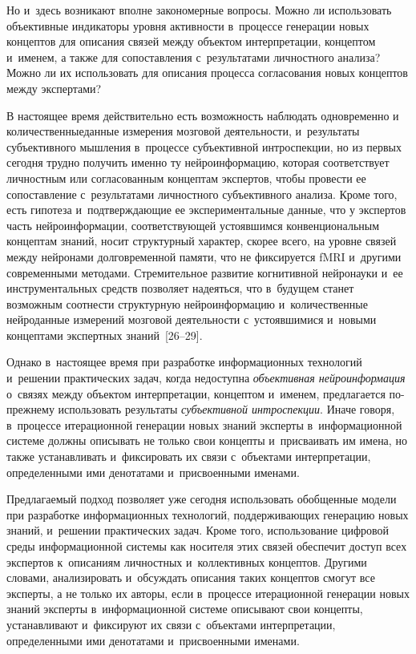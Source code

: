 {\begin{multicols}{2}
      Но и~здесь возникают вполне закономерные вопросы. Можно ли использовать 
объективные индикаторы уровня активности в~процессе генерации новых концептов для 
описания связей между объектом интерпретации, концептом и~именем, а также для 
сопоставления с~результатами личностного анализа? Можно ли их использовать для 
описания процесса согласования новых концептов между экспертами?
      
      В настоящее время действительно есть возможность наблюдать одновременно и~
количественные\linebreak данные измерения мозговой деятельности, и~результаты субъективного 
мышления в~процессе субъективной интроспекции, но из первых сегодня трудно получить 
именно ту нейроинформацию, которая соответствует личностным или согласованным 
концептам экспертов, чтобы провести ее сопоставление с~результатами личностного 
субъективного анализа. Кроме того, есть гипотеза и~подтверждающие ее 
экспериментальные данные, что у экспертов часть нейроинформации, соответствующей 
устоявшимся конвенциональным концептам знаний, носит структурный характер, скорее 
всего, на уровне связей между нейронами долговременной памяти, что не фиксируется 
fMRI и~другими современными методами. Стремительное развитие когнитивной 
нейронауки и~ее инструментальных средств позволяет надеяться, что в~будущем станет 
возможным соотнести структурную нейроинформацию и~количественные нейроданные 
измерений мозговой деятельности с~устоявшимися и~новыми концептами экспертных 
знаний~[26--29].

      
      Однако в~настоящее время при разработке информационных технологий и~решении 
практических задач, когда недоступна \textit{объективная нейроинформация} о~связях 
между объектом интерпретации, концептом и~именем, предлагается по-преж\-не\-му 
использовать результаты \textit{субъективной интроспекции}. Иначе говоря, в~процессе 
итерационной генерации новых знаний эксперты в~информационной системе должны 
описывать не только свои кон\-цеп\-ты и~присваивать им имена, но также устанавливать 
и~фиксировать их связи с~объектами интерпретации, определенными ими денотатами 
и~присвоенными именами.
      
      Предлагаемый подход позволяет уже сегодня использовать обобщенные модели при 
разработке информационных технологий, поддерживающих генерацию новых знаний, 
и~решении практических задач. Кроме того, использование цифровой среды информационной 
системы как носителя этих связей обеспечит доступ всех экспертов к~описаниям 
личностных и~коллективных концептов. Другими словами, анализировать и~обсуждать 
описания таких концептов смогут все эксперты, а не только их авторы, если в~процессе 
итерационной генерации новых знаний эксперты в~информационной системе описывают 
свои концепты, устанавливают и~фиксируют их связи с~объектами интерпретации, 
определенными ими денотатами и~присвоенными именами.



\end{multicols}}
